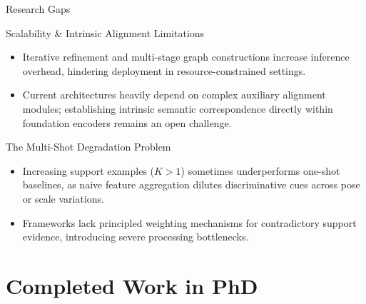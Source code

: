 \documentclass[aspectratio=169, 10pt]{beamer}
\begin{document}
\begin{frame}{Research Gaps}
    \begin{alertblock}{Scalability \& Intrinsic Alignment Limitations}
        \footnotesize
        \begin{itemize}
            \item Iterative refinement and multi-stage graph constructions increase inference overhead, hindering deployment in resource-constrained settings.
            \item Current architectures heavily depend on complex auxiliary alignment modules; establishing intrinsic semantic correspondence directly within foundation encoders remains an open challenge.
        \end{itemize}
    \end{alertblock}
    
      \begin{alertblock}{The Multi-Shot Degradation Problem}
        \footnotesize
        \begin{itemize}
            \item Increasing support examples ($K>1$) sometimes underperforms one-shot baselines, as naive feature aggregation dilutes discriminative cues across pose or scale variations.
            \item Frameworks lack principled weighting mechanisms for contradictory support evidence, introducing severe processing bottlenecks.
        \end{itemize}
    \end{alertblock}
\end{frame}







\section{Completed Work in PhD}
\end{document}
